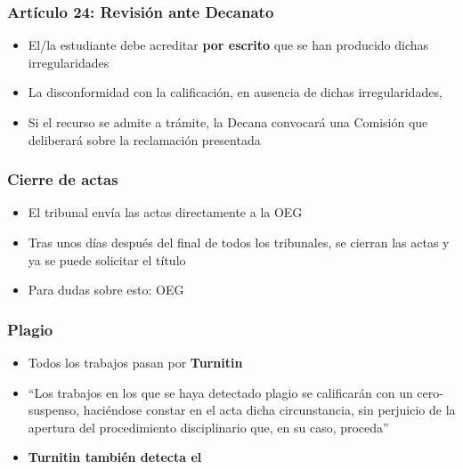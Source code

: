 \documentclass[aspectratio=43]{beamer}
\begin{document}
\begin{frame}
\frametitle{Artículo 24: Revisión ante Decanato}
\centering

\begin{itemize}
  \item El/la estudiante debe acreditar \textbf{por escrito} que se han producido dichas irregularidades
  \item La disconformidad con la calificación, en ausencia de dichas irregularidades, 
  \item Si el recurso se admite a trámite, la Decana convocará una Comisión que deliberará sobre la reclamación presentada
\end{itemize}

\end{frame}

\begin{frame}
\frametitle{Cierre de actas}
\centering

\begin{itemize}
  \item El tribunal envía las actas directamente a la OEG
  \item Tras unos días después del final de todos los tribunales, se cierran las actas y ya se puede solicitar el título
  \item Para dudas sobre esto: OEG
\end{itemize}

\end{frame}

\begin{frame}
\frametitle{Plagio}
\centering

\begin{itemize}
  \item Todos los trabajos pasan por \textbf{Turnitin}
  \item ``Los trabajos en los que se haya detectado plagio se calificarán con un cero-suspenso, haciéndose constar en el acta dicha circunstancia, sin perjuicio de la apertura del procedimiento disciplinario que, en su caso, proceda''
  \item \textbf{Turnitin también detecta el }
\end{itemize}


\end{frame}
\end{document}
